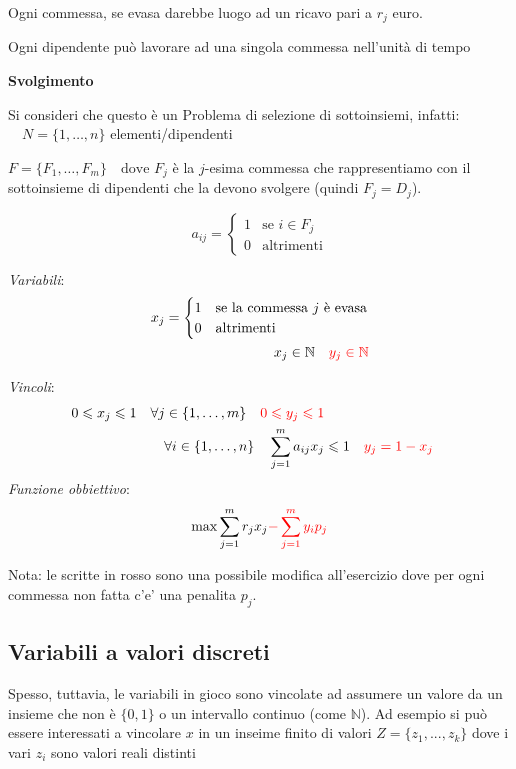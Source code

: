 \begin{itemize}
{Ogni commessa, se evasa darebbe luogo ad un ricavo pari a $r_j$ euro.

Ogni dipendente può lavorare ad una singola commessa nell'unità di tempo 

\textbf{Svolgimento}

Si consideri che questo è un Problema di selezione di sottoinsiemi, infatti:
$\quad N=\{1,\dots,n\}$ elementi/dipendenti

$F = \{F_1, \dots, F_m\} \quad \text{dove } F_j$ è la $j$-esima commessa che rappresentiamo con il sottoinsieme di dipendenti che la devono svolgere (quindi $ F_j = D_j $).

\[
    a_{ij}= \begin{cases}
        1 & \text{se } i\in F_j\\
        0 & \text{altrimenti}
    \end{cases}
\]

\textit{Variabili}:
\[
    \begin{aligned}
        x_j= \begin{cases}
            1 & \text{se la commessa $j$ è evasa}\\
            0 & \text{altrimenti}
        \end{cases}\\
        x_j\in\mathbb{N} \quad \textcolor{red}{y_j\in\mathbb{N}}
    \end{aligned}
\]

\textit{Vincoli}:
\[
    \begin{aligned}
        0\leqslant x_j\leqslant 1 \quad \forall j\in\{1,\dots,m\} \quad \textcolor{red}{0\leqslant y_j\leqslant 1}\\
        \forall i\in\{1,\dots,n\}\quad \sum^m_{j=1}a_{ij}x_j &\leqslant 1 \quad \textcolor{red}{y_j=1-x_j}
    \end{aligned}
\]
\textit{Funzione obbiettivo}:
\[
    \max \sum^m_{j=1}r_jx_j \textcolor{red}{-\sum^m_{j=1}y_ip_j}
\]

Nota: le scritte in rosso sono una possibile modifica all'esercizio dove per ogni commessa non fatta c'e' una penalita $ p_j $.
}

\end{itemize}
\subsection{Variabili a valori discreti}
Spesso, tuttavia, le variabili in gioco sono vincolate ad assumere un valore da un insieme che non è $\{0,1\}$ o un intervallo continuo (come $\mathbb{N}$). Ad esempio si può essere interessati a vincolare $x$ in un inseime finito di valori $Z = \{z_1,...,z_k\}$ dove i vari $z_i$ sono valori reali distinti 

